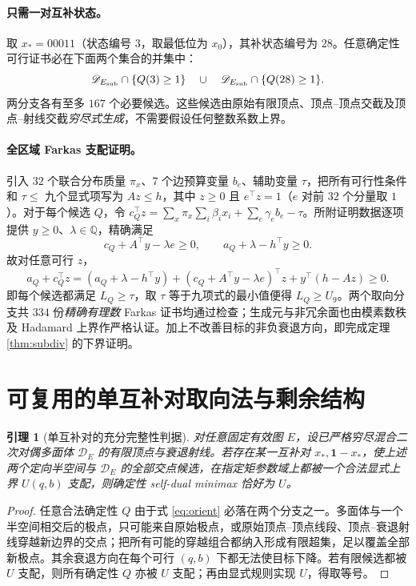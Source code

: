 \documentclass[UTF8,11pt,a4paper]{ctexart}
\newtheorem{lemma}[theorem]{引理}
\begin{document}
\paragraph{只需一对互补状态。}
取 $x_*=00011$（状态编号 $3$，取最低位为 $x_0$），其补状态编号为 $28$。任意确定性可行证书必在下面两个集合的并集中：
\[
 \mathscr D_{E_{\rm sub}}\cap\{Q(3)\ge1\}
 \quad\cup\quad
 \mathscr D_{E_{\rm sub}}\cap\{Q(28)\ge1\}.
\]
两分支各有至多 $167$ 个必要候选。这些候选由原始有限顶点、顶点--顶点交截及顶点--射线交截\emph{穷尽式生成}，不需要假设任何整数系数上界。

\paragraph{全区域 Farkas 支配证明。}
引入 $32$ 个联合分布质量 $\pi_x$、$7$ 个边预算变量 $b_e$、辅助变量 $\tau$，把所有可行性条件和 $\tau\le$ 九个显式项写为 $Az\le h$，其中 $z\ge0$ 且 $e^\top z=1$（$e$ 对前 $32$ 个分量取 $1$）。对于每个候选 $Q$，令 $c_Q^\top z=\sum_x\pi_x\sum_i\beta_ix_i+\sum_e\gamma_eb_e-\tau$。所附证明数据逐项提供 $y\ge0$、$\lambda\in\mathbb Q$，精确满足
\begin{equation}\label{eq:farkas}
 c_Q+A^\top y-\lambda e\ge0,\qquad
 a_Q+\lambda-h^\top y\ge0.
\end{equation}
故对任意可行 $z$，
\[
 a_Q+c_Q^\top z
 =(a_Q+\lambda-h^\top y)+
 (c_Q+A^\top y-\lambda e)^\top z+
 y^\top(h-Az)\ge0.
\]
即每个候选都满足 $L_Q\ge\tau$，取 $\tau$ 等于九项式的最小值便得 $L_Q\ge U_9$。两个取向分支共 $334$ 份\emph{精确有理数} Farkas 证书均通过检查；生成元与非冗余面也由模素数秩及 Hadamard 上界作严格认证。加上不改善目标的非负衰退方向，即完成定理 \ref{thm:subdiv} 的下界证明。

\section{可复用的单互补对取向法与剩余结构}
\begin{lemma}[单互补对的充分完整性判据]
对任意固定有效图 $E$，设已严格穷尽混合二次对偶多面体 $\mathscr D_E$ 的有限顶点与衰退射线。若存在某一互补对 $x_*,\boldsymbol1-x_*$，使上述两个定向半空间与 $\mathscr D_E$ 的全部交点候选，在指定矩参数域上都被一个合法显式上界 $U(q,b)$ 支配，则确定性 self-dual minimax 恰好为 $U$。
\end{lemma}
\begin{proof}
任意合法确定性 $Q$ 由于式 \eqref{eq:orient} 必落在两个分支之一。多面体与一个半空间相交后的极点，只可能来自原始极点，或原始顶点--顶点线段、顶点--衰退射线穿越新边界的交点；把所有可能的穿越组合都纳入形成有限超集，足以覆盖全部新极点。其余衰退方向在每个可行 $(q,b)$ 下都无法使目标下降。若有限候选都被 $U$ 支配，则所有确定性 $Q$ 亦被 $U$ 支配；再由显式规则实现 $U$，得取等号。
\end{proof}
\end{document}
